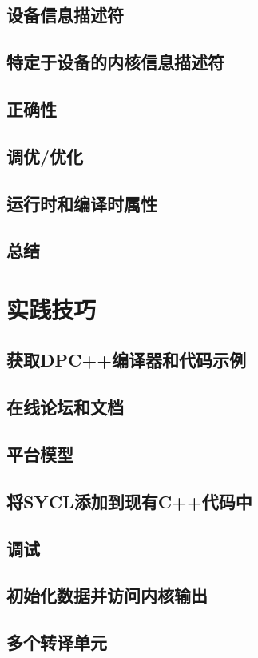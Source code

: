\documentclass[11pt,a4paper,UTF8]{ctexart}
\begin{document}
		\subsection{设备信息描述符}
		\subsection{特定于设备的内核信息描述符}
		\subsection{正确性}
		\subsection{调优/优化}
		\subsection{运行时和编译时属性}
		\subsection{总结}
	\section{实践技巧}
		\subsection{获取DPC++编译器和代码示例}
		\subsection{在线论坛和文档}
		\subsection{平台模型}
		\subsection{将SYCL添加到现有C++代码中}
		\subsection{调试}
		\subsection{初始化数据并访问内核输出}
		\subsection{多个转译单元}
\end{document}
